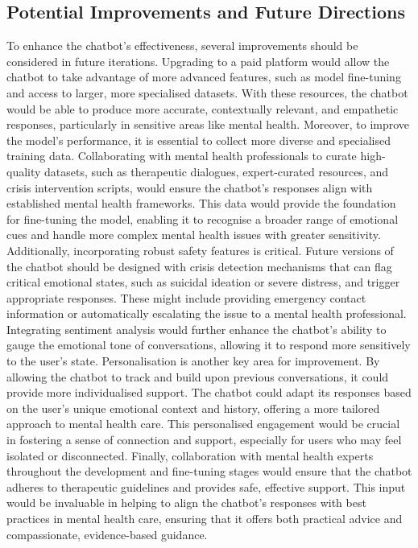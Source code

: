 \subsection*{Potential Improvements and Future Directions} 
To enhance the chatbot’s effectiveness, several improvements should be considered in future iterations. Upgrading to a paid platform would allow the chatbot to take advantage of more advanced features, such as model fine-tuning and access to larger, more specialised datasets. With these resources, the chatbot would be able to produce more accurate, contextually relevant, and empathetic responses, particularly in sensitive areas like mental health.
Moreover, to improve the model’s performance, it is essential to collect more diverse and specialised training data. Collaborating with mental health professionals to curate high-quality datasets, such as therapeutic dialogues, expert-curated resources, and crisis intervention scripts, would ensure the chatbot’s responses align with established mental health frameworks. This data would provide the foundation for fine-tuning the model, enabling it to recognise a broader range of emotional cues and handle more complex mental health issues with greater sensitivity.
Additionally, incorporating robust safety features is critical. Future versions of the chatbot should be designed with crisis detection mechanisms that can flag critical emotional states, such as suicidal ideation or severe distress, and trigger appropriate responses. These might include providing emergency contact information or automatically escalating the issue to a mental health professional. Integrating sentiment analysis would further enhance the chatbot’s ability to gauge the emotional tone of conversations, allowing it to respond more sensitively to the user’s state.
Personalisation is another key area for improvement. By allowing the chatbot to track and build upon previous conversations, it could provide more individualised support. The chatbot could adapt its responses based on the user’s unique emotional context and history, offering a more tailored approach to mental health care. This personalised engagement would be crucial in fostering a sense of connection and support, especially for users who may feel isolated or disconnected.
Finally, collaboration with mental health experts throughout the development and fine-tuning stages would ensure that the chatbot adheres to therapeutic guidelines and provides safe, effective support. This input would be invaluable in helping to align the chatbot’s responses with best practices in mental health care, ensuring that it offers both practical advice and compassionate, evidence-based guidance.
